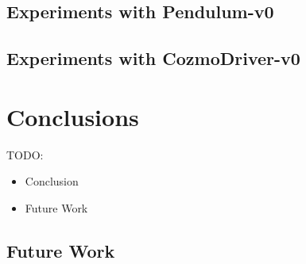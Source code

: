 \documentclass[10pt,twocolumn,letterpaper]{article}
\begin{document}
\subsection{Experiments with Pendulum-v0}

\subsection{Experiments with CozmoDriver-v0}

\section{Conclusions}

TODO:
\begin{itemize}
    \item Conclusion
    \item Future Work
\end{itemize}

\subsection{Future Work}


{\small
    
    
}
\end{document}
